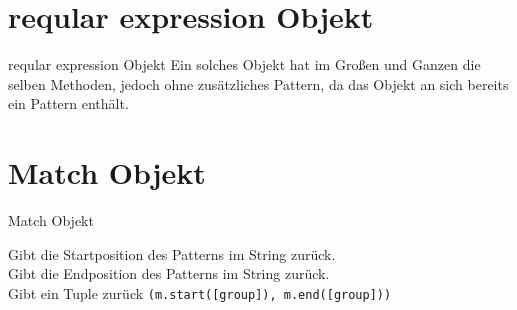 \section{reqular expression Objekt}
\begin{frame}{reqular expression Objekt}
	Ein solches Objekt hat im Großen und Ganzen die selben Methoden, jedoch ohne zusätzliches Pattern, da das Objekt an sich bereits ein Pattern enthält.
\end{frame}

\section{Match Objekt}
\begin{frame}{Match Objekt}
	
	Gibt die Startposition des Patterns im String zurück.\\[.25cm]
	
	Gibt die Endposition des Patterns im String zurück.\\[.25cm]
	
	Gibt ein Tuple zurück \texttt{(m.start([group]), m.end([group]))}
\end{frame}



